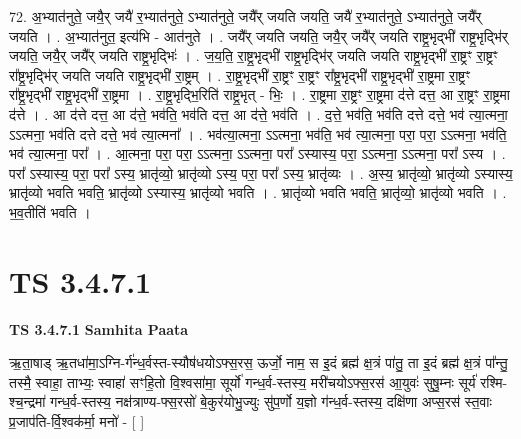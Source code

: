 \documentclass[17pt]{extarticle}
\begin{document}
72. अ॒भ्यात॑नुते॒ जयै॒र् जयै॑ र॒भ्यात॑नुते॒ ऽभ्यात॑नुते॒ जयै᳚र् जयति जयति॒ जयै॑ र॒भ्यात॑नुते॒ ऽभ्यात॑नुते॒ जयै᳚र् जयति । . अ॒भ्यात॑नुत॒ इत्य॑भि - आत॑नुते । . जयै᳚र् जयति जयति॒ जयै॒र् जयै᳚र् जयति राष्ट्र॒भृद्भी॑ राष्ट्र॒भृद्भि॑र् जयति॒ जयै॒र् जयै᳚र् जयति राष्ट्र॒भृद्भिः॑ । . ज॒य॒ति॒ रा॒ष्ट्र॒भृद्भी॑ राष्ट्र॒भृद्भि॑र् जयति जयति राष्ट्र॒भृद्भी॑ रा॒ष्ट्रꣳ रा॒ष्ट्रꣳ 
रा᳚ष्ट्र॒भृद्भि॑र् जयति जयति राष्ट्र॒भृद्भी॑ रा॒ष्ट्रम् । . रा॒ष्ट्र॒भृद्भी॑ रा॒ष्ट्रꣳ रा॒ष्ट्रꣳ रा᳚ष्ट्र॒भृद्भी॑ राष्ट्र॒भृद्भी॑ रा॒ष्ट्रमा रा॒ष्ट्रꣳ 
रा᳚ष्ट्र॒भृद्भी॑ राष्ट्र॒भृद्भी॑ रा॒ष्ट्रमा । . रा॒ष्ट्र॒भृद्भि॒रिति॑ राष्ट्र॒भृत् - भिः॒ । . रा॒ष्ट्रमा रा॒ष्ट्रꣳ रा॒ष्ट्रमा द॑त्ते दत्त॒ आ रा॒ष्ट्रꣳ रा॒ष्ट्रमा द॑त्ते । . आ द॑त्ते दत्त॒ आ द॑त्ते॒ भव॑ति॒ भव॑ति दत्त॒ आ द॑त्ते॒ भव॑ति । . द॒त्ते॒ भव॑ति॒ भव॑ति दत्ते दत्ते॒ भव॑ त्या॒त्मना॒ ऽऽत्मना॒ भव॑ति दत्ते दत्ते॒ भव॑ त्या॒त्मना᳚ । . भव॑त्या॒त्मना॒ ऽऽत्मना॒ भव॑ति॒ भव॑ त्या॒त्मना॒ परा॒ परा॒ ऽऽत्मना॒ भव॑ति॒ भव॑ त्या॒त्मना॒ परा᳚ । . आ॒त्मना॒ परा॒ परा॒ ऽऽत्मना॒ ऽऽत्मना॒ परा᳚ ऽस्यास्य॒ परा॒ ऽऽत्मना॒ ऽऽत्मना॒ परा᳚ ऽस्य । . परा᳚ ऽस्यास्य॒ परा॒ परा᳚ ऽस्य॒ भ्रातृ॑व्यो॒ भ्रातृ॑व्यो ऽस्य॒ परा॒ परा᳚ ऽस्य॒ भ्रातृ॑व्यः । . अ॒स्य॒ भ्रातृ॑व्यो॒ भ्रातृ॑व्यो ऽस्यास्य॒ भ्रातृ॑व्यो भवति भवति॒ भ्रातृ॑व्यो ऽस्यास्य॒ भ्रातृ॑व्यो भवति । . भ्रातृ॑व्यो भवति भवति॒ भ्रातृ॑व्यो॒ भ्रातृ॑व्यो भवति । . भ॒व॒तीति॑ भवति । \newline
\pagebreak
{}

\section{ TS 3.4.7.1 }

\textbf{TS 3.4.7.1 } \newline
\textbf{Samhita Paata} \newline

ऋ॒ता॒षाड् ऋ॒तधा॑मा॒ऽग्नि-र्ग॑न्ध॒र्वस्त-स्यौष॑धयोऽफ्स॒रस॒ ऊर्जो॒ नाम॒ स इ॒दं ब्रह्म॑ क्ष॒त्रं पा॑तु॒ ता इ॒दं ब्रह्म॑ क्ष॒त्रं पा᳚न्तु॒ तस्मै॒ स्वाहा॒ ताभ्यः॒ स्वाहा॑ सꣳहि॒तो वि॒श्वसा॑मा॒ सूर्यो॑ गन्ध॒र्व-स्तस्य॒ मरी॑चयोऽफ्स॒रस॑ आ॒युवः॑ सुषु॒म्नः सूर्य॑ रश्मि-श्च॒न्द्रमा॑ गन्ध॒र्व-स्तस्य॒ नक्ष॑त्राण्य-फ्स॒रसो॑ बे॒कुर॑योभु॒ज्युः सु॑प॒र्णो य॒ज्ञो ग॑न्ध॒र्व-स्तस्य॒ दक्षि॑णा अप्स॒रस॑ स्त॒वाः प्र॒जाप॑ति-र्वि॒श्वक॑र्मा॒ मनो॑ - [  ] \newline
\end{document}
